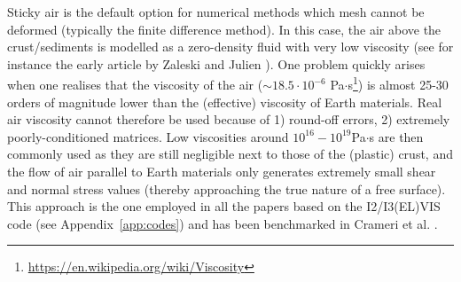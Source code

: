 Sticky air is the default option for numerical methods which mesh 
cannot be deformed (typically the finite difference method).
In this case, the air above the crust/sediments is modelled as a zero-density fluid with 
very low viscosity (see for instance the early article by Zaleski and Julien \cite{zaju92}). 
One problem quickly arises when one realises that the viscosity of the 
air ($\sim 18.5\cdot10^{-6}$ Pa$\cdot$s\footnote{\url{https://en.wikipedia.org/wiki/Viscosity}})
is almost 25-30 orders of magnitude lower than the (effective) viscosity of Earth materials. 
Real air viscosity cannot therefore be used because of 1) round-off errors, 2) extremely 
poorly-conditioned matrices. Low viscosities around $10^{16}-10^{19}$Pa$\cdot$s are then 
commonly used as they are still negligible next to those of the (plastic) crust, and the 
flow of air parallel to Earth materials only generates extremely small shear and normal stress values
(thereby approaching the true nature of a free surface). 
This approach is the one employed in all the papers based on the I2/I3(EL)VIS code (see Appendix~\ref{app:codes})
and has been benchmarked in Crameri et al. \cite{crsg12}.

